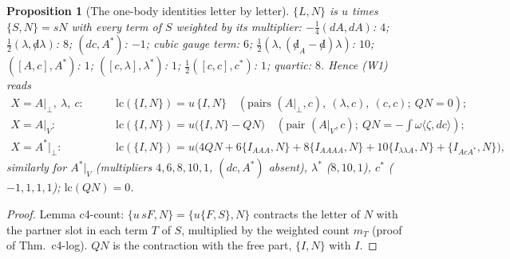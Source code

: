 \documentclass[11pt]{article}
\numberwithin{equation}{section}
\theoremstyle{plain}
\newtheorem{proposition}[theorem]{Proposition}
\theoremstyle{definition}
\begin{document}
\begin{proposition}[The one-body identities letter by letter]
\label{prop:tl-W1}
$\{L,N\}$ is $u$ times $\{S,N\}=sN$ with every term of $S$ weighted by its multiplier: $-\tfrac14(dA,dA)$: $4$; $\tfrac12(\lambda,{\not d}\lambda)$: $8$; $(dc,A^*)$: $-1$; cubic gauge term: $6$; $\tfrac12(\lambda,({\not d}_A-{\not d})\lambda)$: $10$; $([A,c],A^*)$: $1$; $([c,\lambda],\lambda^*)$: $1$; $\tfrac12([c,c],c^*)$: $1$; quartic: $8$. Hence (W1) reads
\[
\begin{aligned}
X=A|_\perp,\ \lambda,\ c:&\qquad \mathrm{lc}(\{I,N\})=u\,\{I,N\}\quad(\text{pairs }(A|_\perp,c),\ (\lambda,c),\ (c,c);\ QN=0);\\
X=A|_V:&\qquad \mathrm{lc}(\{I,N\})=u\big(\{I,N\}-QN\big)\quad(\text{pair }(A|_V,c);\ QN=-\textstyle\int\omega\langle\zeta,dc\rangle);\\
X=A^*|_\perp:&\qquad \mathrm{lc}(\{I,N\})=u\big(4QN+6\{I_{AAA},N\}+8\{I_{AAAA},N\}+10\{I_{\lambda\lambda A},N\}+\{I_{AcA^*},N\}\big),
\end{aligned}
\]
similarly for $A^*|_V$ (multipliers $4,6,8,10,1$, $(dc,A^*)$ absent), $\lambda^*$ ($8,10,1$), $c^*$ ($-1,1,1,1$); $\mathrm{lc}(QN)=0$.
\end{proposition}

\begin{proof}
Lemma c4-count: $\{u\,sF,N\}=\{u\{F,S\},N\}$ contracts the letter of $N$ with the partner slot in each term $T$ of $S$, multiplied by the weighted count $m_T$ (proof of Thm.~c4-log). $QN$ is the contraction with the free part, $\{I,N\}$ with $I$.
\end{proof}
\end{document}
